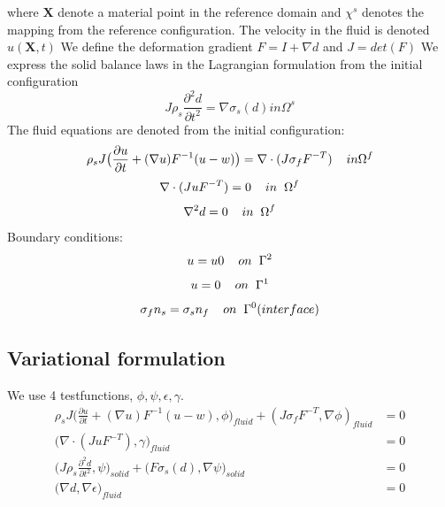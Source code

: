 where $\textbf{X}$ denote a material point in the reference domain and $\chi^s$ denotes the mapping from the reference configuration.
The velocity in the fluid is denoted $u(\textbf{X},t)$
We define the deformation gradient $F = I + \nabla d$ and $J = det(F)$
We express the solid balance laws in the Lagrangian formulation from the initial configuration
$$J\rho_s \frac{\partial^2 d}{\partial t^2} = \nabla \sigma_s(d) in \Omega^s $$
The fluid equations are denoted from the initial configuration:
$$ \rho_s J \big( \frac{\partial u}{\partial t} + (\nabla u)F^{-1}(u-w)\big) = \nabla \cdot (J\sigma_f F^{-T} )\hspace{4mm} in \Omega^f $$
$$ \nabla \cdot (J u F^{-T}) = 0 \hspace{4mm} in \hspace{2mm} \Omega^f$$
$$ \nabla^2 d = 0\hspace{4mm}in \hspace{2mm} \Omega^f $$
Boundary conditions:
$$ u = u0 \hspace{4mm}on \hspace{2mm} \Gamma^2$$
$$ u = 0  \hspace{4mm}on \hspace{2mm} \Gamma^1  $$
$$  \sigma_f n_s = \sigma_s n_f \hspace{4mm} on  \hspace{2mm}\Gamma^0 (interface)   $$
\subsection*{Variational formulation}
We use 4 testfunctions, $\phi, \psi, \epsilon, \gamma$.
\begin{align*}
\rho_s J \big( \frac{\partial u}{\partial t} + (\nabla u)F^{-1}(u-w) , \phi\big)_{fluid} + (J\sigma_f F^{-T},\nabla \phi )_{fluid} &= 0  \\
 \big( \nabla \cdot (J u F^{-T}),\gamma \big)_{fluid} &= 0 \\
\big(J\rho_s \frac{\partial^2 d}{\partial t^2},\psi \big)_{solid} + \big(F \sigma_s(d), \nabla \psi \big)_{solid} &=0 \\
 \big( \nabla d , \nabla \epsilon \big)_{fluid} &= 0
\end{align*}



